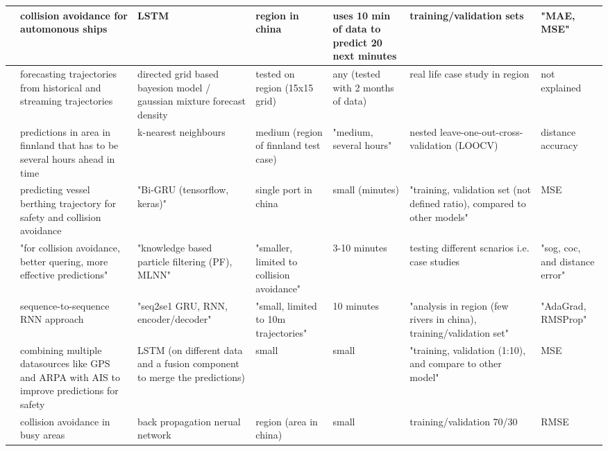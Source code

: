 \begin{sidewaystable}
{\begin{tabular}{|l|l|l|l|l|l|l|}
        \cite{Tang2019ANetwork} & collision avoidance for automonous ships & LSTM & region in china & uses 10 min of data to predict 20 next minutes & training/validation sets & "MAE, MSE" \\ \hline
        \cite{Uney2019DataModels} & forecasting trajectories from historical and streaming trajectories & directed grid based bayesion model / gaussian mixture forecast density & tested on region (15x15 grid) & any (tested with 2 months of data) & real life case study in region & not explained \\ \hline
        \cite{Virjonen2018ShipMethod} & predictions in area in finnland that has to be several hours ahead in time & k-nearest neighbours & medium (region of finnland test case) & "medium, several hours" & nested leave-one-out-cross-validation (LOOCV) & distance accuracy \\ \hline
        \cite{Wang2020VesselGRU} & predicting vessel berthing trajectory for safety and collision avoidance & "Bi-GRU (tensorflow, keras)" & single port in china & small (minutes) & "training, validation set (not defined ratio), compared to other models" & MSE \\ \hline
        \cite{Xiao2020BigTechniques} & "for collision avoidance, better quering, more effective predictions" & "knowledge based particle filtering (PF), MLNN" & "smaller, limited to collision avoidance" & 3-10 minutes & testing different scnarios i.e. case studies & "sog, coc, and distance error" \\ \hline
        \cite{You2020ST-Seq2Seq:Prediction} & sequence-to-sequence RNN approach & "seq2se1 GRU, RNN, encoder/decoder" & "small, limited to 10m trajectories" & 10 minutes & "analysis in region (few rivers in china), training/validation set" & "AdaGrad, RMSProp" \\ \hline
        \cite{Zheng2020HeterogenousModeling} & combining multiple datasources like GPS and ARPA with AIS to improve predictions for safety & LSTM (on different data and a fusion component to merge the predictions) & small & small & "training, validation (1:10), and compare to other model" & MSE \\ \hline
        \cite{Zhou2019ShipNetwork} & collision avoidance in busy areas & back propagation nerual network & region (area in china) & small & training/validation 70/30 & RMSE \\ \hline
    \end{tabular}
    }
\end{sidewaystable}